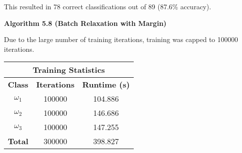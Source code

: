 \documentclass{article}
\newcommand{\fakesection}[1]{{\bf #1}\par}
\begin{document}
This resulted in 78 correct classifications out of 89 (87.6\% accuracy).

\bigskip
\fakesection{Algorithm 5.8 (Batch Relaxation with Margin)}
Due to the large number of training iterations, training was capped to 100000 iterations.
\begin{center}
\begin{tabular}{|c|c|c|}
\multicolumn{3}{c}{{\bf Training Statistics}}\\
\hline{\bf Class} & {\bf Iterations} & {\bf Runtime (s)}\\\hline
$\omega_1$ & 100000 & 104.886 \\
$\omega_2$ & 100000 & 146.686 \\
$\omega_3$ & 100000 & 147.255\\\hline
{\bf Total} & 300000 & 398.827\\\hline
\end{tabular}
\end{center}
\end{document}
